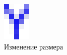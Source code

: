 \documentclass[russian,utf8,emptystyle]{eskdtext}
\begin{document}
\begin{figure}[!htb]
\includegraphics[width=\linewidth]{input-ex-resized}
\caption{Изменение размера}
\endminipage\hfill
{}

\end{figure}
\end{document}

